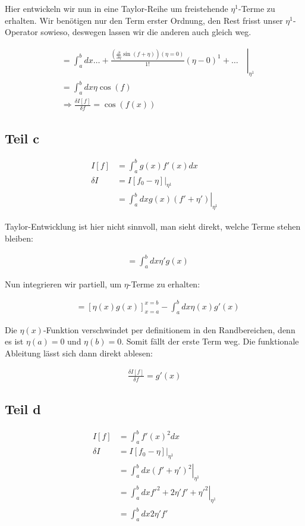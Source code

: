\documentclass[a4paper,german,12pt,smallheadings]{scrartcl}
\begin{document}
Hier entwickeln wir nun in eine Taylor-Reihe um freistehende $\eta^1$-Terme zu
erhalten. Wir benötigen nur den Term erster Ordnung, den Rest frisst unser
$\eta^1$-Operator sowieso, deswegen lassen wir die anderen auch gleich weg.

\begin{align*}
  &=\left.\int_a^b dx \dots + \frac{\left(\frac{\partial}{\partial \eta} \sin(f+\eta)\right)(\eta=0)}{1!} (\eta - 0)^1 + \dots\quad\right|_{\eta^1} \\
  &=\int_a^b dx \eta \cos(f) \\
  &\Rightarrow \frac{\delta I[f]}{\delta f} = \cos(f(x))
\end{align*}

\subsection*{Teil c}
\begin{align*}
  I[f] &= \int_a^b g(x)f'(x) dx \\
  \delta I &= \left.I[f_0 - \eta]\right|_{\eta^1} \\
  &=\left.\int_a^b dx g(x)(f' + \eta') \right|_{\eta^1}
\end{align*}

Taylor-Entwicklung ist hier nicht sinnvoll, man sieht direkt, welche Terme stehen bleiben:

\begin{align*}
  &=\int_a^b dx \eta' g(x)
\end{align*}

Nun integrieren wir partiell, um $\eta$-Terme zu erhalten:

\begin{align*}
  &=\left[\eta(x) g(x)\right]_{x=a}^{x=b} - \int_a^b dx \eta(x) g'(x)
\end{align*}

Die $\eta(x)$-Funktion verschwindet per definitionem in den Randbereichen, denn
es ist $\eta(a) = 0$ und $\eta(b) = 0$. Somit fällt der erste Term weg. Die
funktionale Ableitung lässt sich dann direkt ablesen:

\begin{align*}
  \frac{\delta I[f]}{\delta f} = g'(x)
\end{align*}

\subsection*{Teil d}
\begin{align*}
  I[f] &= \int_a^b f'(x)^2 dx \\
  \delta I &= \left.I[f_0 - \eta]\right|_{\eta^1} \\
  &=\left.\int_a^b dx (f' + \eta')^2 \right|_{\eta^1} \\
  &=\left.\int_a^b dx f'^2 + 2\eta'f' + \eta'^2 \right|_{\eta^1} \\
  &=\int_a^b dx 2\eta'f'
\end{align*}
\end{document}
